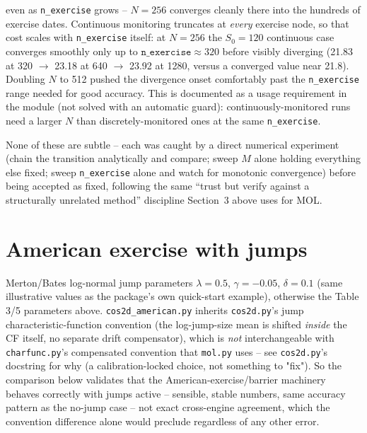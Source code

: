 \documentclass[11pt]{article}
\begin{document}
\begin{enumerate}
even as \texttt{n\_exercise} grows -- $N{=}256$ converges cleanly there into
the hundreds of exercise dates. Continuous monitoring truncates at
\emph{every} exercise node, so that cost scales with \texttt{n\_exercise}
itself: at $N{=}256$ the $S_0{=}120$ continuous case converges smoothly only
up to $\texttt{n\_exercise}\approx320$ before visibly diverging (21.83 at
320 $\to$ 23.18 at 640 $\to$ 23.92 at 1280, versus a converged value near
21.8). Doubling $N$ to 512 pushed the divergence onset comfortably past the
\texttt{n\_exercise} range needed for good accuracy. This is documented as a
usage requirement in the module (not solved with an automatic guard):
continuously-monitored runs need a larger $N$ than discretely-monitored ones
at the same \texttt{n\_exercise}.
\end{enumerate}

None of these are subtle -- each was caught by a direct numerical experiment
(chain the transition analytically and compare; sweep $M$ alone holding
everything else fixed; sweep \texttt{n\_exercise} alone and watch for
monotonic convergence) before being accepted as fixed, following the same
``trust but verify against a structurally unrelated method'' discipline
Section~3 above uses for MOL.

\section{American exercise with jumps}

Merton/Bates log-normal jump parameters $\lambda{=}0.5$, $\gamma{=}-0.05$,
$\delta{=}0.1$ (same illustrative values as the package's own quick-start
example), otherwise the Table 3/5 parameters above. \texttt{cos2d\_american.py}
inherits \texttt{cos2d.py}'s jump characteristic-function convention (the
log-jump-size mean is shifted \emph{inside} the CF itself, no separate drift
compensator), which is \emph{not} interchangeable with \texttt{charfunc.py}'s
compensated convention that \texttt{mol.py} uses -- see \texttt{cos2d.py}'s
docstring for why (a calibration-locked choice, not something to "fix"). So
the comparison below validates that the American-exercise/barrier machinery
behaves correctly with jumps active -- sensible, stable numbers, same
accuracy pattern as the no-jump case -- not exact cross-engine agreement,
which the convention difference alone would preclude regardless of any other
error.
\end{document}
